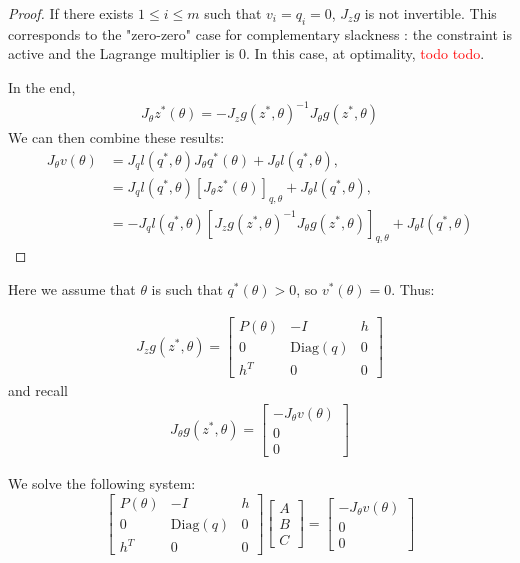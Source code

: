\begin{proof}
If there exists $1 \leq i\leq m$ such that $v_i = q_i = 0$, $J_z g$ is not invertible. This corresponds to the "zero-zero" case for complementary slackness : the constraint is active and the Lagrange multiplier is $0$. In this case, at optimality, \textcolor{red}{todo todo}.


In the end,
\begin{align}
    J_\theta z^*(\theta) = - J_zg(z^*, \theta)^{-1}J_\theta g(z^*, \theta)
\end{align}
We can then combine these results:
\begin{align}
J_\theta v(\theta) &=  J_q l(q^*, \theta)J_\theta q^*(\theta) + J_\theta l(q^*, \theta),\\
&= J_q l(q^*, \theta)  \left[J_\theta z^*(\theta)\right]_{q, \theta} + J_\theta l(q^*, \theta),\\
&= - J_ql(q^*, \theta) \left[J_z g(z^*, \theta)^{-1} J_\theta g(z^*, \theta)\right]_{q,\theta}+ J_\theta l(q^*, \theta)
\end{align}
\end{proof}

Here we assume that $\theta$ is such that $q^*(\theta) > 0 $, so $v^*(\theta)=0$. Thus:

\begin{align}
    J_z g(z^*, \theta) = \begin{bmatrix}
    P(\theta) & - I & h\\
    0 & \mathrm{Diag}(q)& 0\\
    h^T & 0 & 0
    \end{bmatrix}
\end{align}
 and recall
\begin{align}
    J_\theta g(z^*, \theta) = \begin{bmatrix}
    -J_\theta v(\theta)\\
    0 \\
    0
    \end{bmatrix}
\end{align}

We solve the following system:
\begin{equation}
\begin{bmatrix}
    P(\theta) & - I & h\\
    0 & \mathrm{Diag}(q)& 0\\
    h^T & 0 & 0
    \end{bmatrix}
\begin{bmatrix}
    A \\
    B \\
    C
    \end{bmatrix} =
\begin{bmatrix}
    - J_\theta v(\theta) \\
    0 \\
    0
    \end{bmatrix}
\end{equation}

